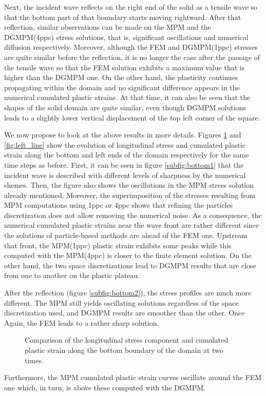 Next, the incident wave reflects on the right end of the solid as a tensile wave so that the bottom part of that boundary starts moving rightward.
After that reflection, similar observations can be made on the MPM and the DGMPM(4ppc) stress solutions, that is, significant oscillations and numerical diffusion respectively.
Moreover, although the FEM and DGMPM(1ppc) stresses are quite similar before the reflection, it is no longer the case after the passage of the tensile wave so that the FEM solution exhibits a maximum value that is higher than the DGMPM one.
On the other hand, the plasticity continues propagating within the domain and no significant difference appears in the numerical cumulated plastic strains.
At that time, it can also be seen that the shapes of the solid domain are quite similar, even though DGMPM solutions leads to a slightly lower vertical displacement of the top left corner of the square.

We now propose to look at the above results in more details.
Figures \ref{fig:bottom_line} and \ref{fig:left_line} show the evolution of longitudinal stress and cumulated plastic strain along the bottom and left ends of the domain respectively for the same time steps as before.
First, it can be seen in figure \ref{subfig:bottom1} that the incident wave is described with different levels of sharpness by the numerical shemes.
Then, the figure also shows the oscillations in the MPM stress solution already mentioned.
Moreover, the superimposition of the stresses resulting from MPM computations using 1ppc or 4ppc shows that refining the particles discretization does not allow removing the numerical noise.
As a consequence, the numerical cumulated plastic strains near the wave front are rather different since the solutions of particle-based methods are ahead of the FEM one.
Upstream that front, the MPM(1ppc) plastic strain exhibits some peaks while this computed with the MPM(4ppc) is closer to the finite element solution.
On the other hand, the two space discretizations lead to DGMPM results that are close from one to another on the plastic plateau.

After the reflection (figure \ref{subfig:bottom2}), the stress profiles are much more different.
The MPM still yields oscillating solutions regardless of the space discretization used, and DGMPM results are smoother than the other.
Once Again, the FEM leads to a rather sharp solution.
\begin{figure}[ht]
  \centering
  {}
  {}
  
  \caption{Comparison of the longitudinal stress component and cumulated plastic strain along the bottom boundary of the domain at two times.}
  \label{fig:bottom_line}
\end{figure}
Furthermore, the MPM cumulated plastic strain curves oscillate around the FEM one which, in turn, is above these computed with the DGMPM.

